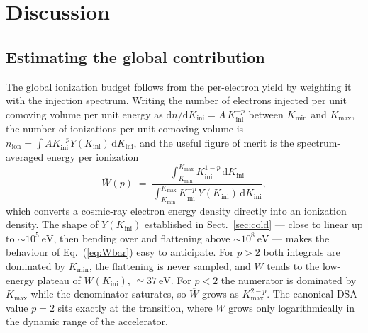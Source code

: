 \documentclass[twocolumn]{article}
\newcommand{\Kini}{K_{\mathrm{ini}}}
\begin{document}
\section{Discussion}

\subsection{Estimating the global contribution}
\label{sec:global}

The global ionization budget follows from the per-electron yield by weighting
it with the injection spectrum. Writing the number of electrons injected per
unit comoving volume per unit energy as
$\mathrm{d}n/\mathrm{d}\Kini = A\,\Kini^{-p}$ between $K_{\min}$ and
$K_{\max}$, the number of ionizations per unit comoving volume is
$n_{\mathrm{ion}} = \int A \Kini^{-p} Y(\Kini)\,\mathrm{d}\Kini$, and the
useful figure of merit is the spectrum-averaged energy per ionization
\begin{equation}
\overline{W}(p) \;=\;
\frac{\displaystyle\int_{K_{\min}}^{K_{\max}} \Kini^{1-p}\,\mathrm{d}\Kini}
     {\displaystyle\int_{K_{\min}}^{K_{\max}} \Kini^{-p}\,Y(\Kini)\,\mathrm{d}\Kini},
\label{eq:Wbar}
\end{equation}
which converts a cosmic-ray electron energy density directly into an ionization
density. The shape of $Y(\Kini)$ established in Sect.~\ref{sec:cold} ---
close to linear up to $\sim\!10^{5}\ \mathrm{eV}$, then bending over and
flattening above $\sim\!10^{8}\ \mathrm{eV}$ --- makes the behaviour of
Eq.~(\ref{eq:Wbar}) easy to anticipate. For $p > 2$ both integrals are dominated by $K_{\min}$,
the flattening is never sampled, and $\overline{W}$ tends to the
low-energy plateau of $W(\Kini)$, $\simeq\!37\ \mathrm{eV}$. For $p < 2$ the numerator is dominated by $K_{\max}$ while
the denominator saturates, so $\overline{W}$ grows as $K_{\max}^{2-p}$. The
canonical DSA value $p = 2$ sits exactly at the transition, where
$\overline{W}$ grows only logarithmically in the dynamic range of the
accelerator.
\end{document}
